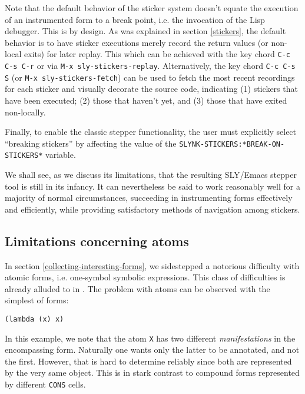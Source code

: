 \documentclass[format=sigconf]{acmart}
\begin{document}
Note that the default behavior of the sticker system doesn't equate
the execution of an instrumented form to a break point, i.e. the
invocation of the Lisp debugger.  This is by design.  As was explained
in section \ref{stickers}, the default behavior is to have sticker
executions merely record the return values (or non-local exits) for
later replay.  This which can be achieved with the key chord
\texttt{C-c C-s C-r} or via \texttt{M-x sly-stickers-replay}.
Alternatively, the key chord \texttt{C-c C-s S} (or \texttt{M-x
  sly-stickers-fetch}) can be used to fetch the most recent recordings
for each sticker and visually decorate the source code, indicating (1)
stickers that have been executed; (2) those that haven't yet, and (3)
those that have exited non-locally.

Finally, to enable the classic stepper functionality, the user must
explicitly select ``breaking stickers'' by affecting the value of the
\texttt{SLYNK-STICKERS:*BREAK-ON-STICKERS*} variable.

We shall see, as we discuss its limitations, that the resulting
SLY/Emacs stepper tool is still in its infancy.  It can nevertheless
be said to work reasonably well for a majority of normal
circumstances, succeeding in instrumenting forms effectively and
efficiently, while providing satisfactory methods of navigation among
stickers.

\subsection{Limitations concerning atoms}\label{atoms}

In section \ref{collecting-interesting-forms}, we sidestepped a
notorious difficulty with atomic forms, i.e. one-symbol symbolic
expressions.  This class of difficulties is already alluded to in
\cite[I-4.8]{annotation-based}.  The problem with atoms can be
observed with the simplest of forms:

\begin{verbatim}
(lambda (x) x)
\end{verbatim}

In this example, we note that the atom \texttt{X} has two different
\emph{manifestations} in the encompassing form.  Naturally one wants
only the latter to be annotated, and not the first.  However, that is
hard to determine reliably since both are represented by the very same
object.  This is in stark contrast to compound forms represented by
different \texttt{CONS} cells.
\end{document}
